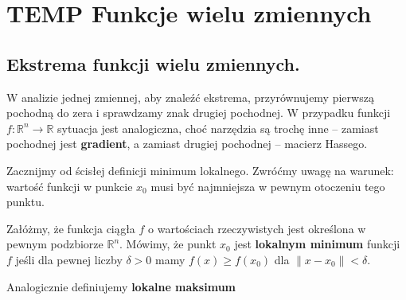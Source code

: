\chapter{TEMP Funkcje wielu zmiennych}

\section{Ekstrema funkcji wielu zmiennych.}

W analizie jednej zmiennej, aby znaleźć ekstrema, przyrównujemy pierwszą pochodną do zera i sprawdzamy znak drugiej pochodnej. W przypadku funkcji $f: \mathbb{R}^{n}\to \mathbb{R}$ sytuacja jest analogiczna, choć narzędzia są trochę inne -- zamiast pochodnej jest \textbf{gradient}, a zamiast drugiej pochodnej -- macierz Hassego. 

Zacznijmy od ścisłej definicji minimum lokalnego. Zwróćmy uwagę na warunek: wartość funkcji w punkcie $x_0$ musi być najmniejsza w pewnym otoczeniu tego punktu.

\begin{definition}
	Załóżmy, że funkcja ciągła $f$ o wartościach rzeczywistych jest określona w pewnym podzbiorze $\mathbb{R}^{n}$. Mówimy, że punkt $x_{0}$ jest \textbf{lokalnym minimum} funkcji $f$ jeśli dla pewnej liczby $\delta > 0$ mamy $f\left( x \right) \ge f\left( x_0 \right) $ dla $\|x-x_0\| < \delta$.

Analogicznie definiujemy \textbf{lokalne maksimum} 
\end{definition}  
